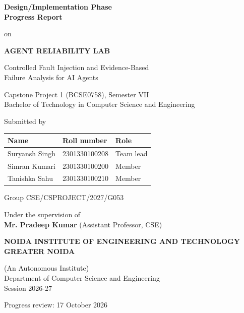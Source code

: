 \documentclass[12pt,a4paper,oneside]{report}
\begin{document}
\begin{titlepage}
\centering
\onehalfspacing
{\fontsize{20}{26}\selectfont\bfseries Design/Implementation Phase\\ Progress Report\par}
\vspace{0.8cm}
{\fontsize{14}{18}\selectfont on\par}
\vspace{0.4cm}
{\fontsize{20}{26}\selectfont\bfseries AGENT RELIABILITY LAB\par}
\vspace{0.2cm}
{\fontsize{14}{18}\selectfont Controlled Fault Injection and Evidence-Based\\ Failure Analysis for AI Agents\par}
\vspace{0.8cm}
{\fontsize{14}{18}\selectfont Capstone Project 1 (BCSE0758), Semester VII\\ Bachelor of Technology in Computer Science and Engineering\par}
\vspace{0.8cm}
{\fontsize{14}{18}\selectfont Submitted by\par}
\vspace{0.3cm}
\begin{tabular}{lll}
\toprule
\textbf{Name} & \textbf{Roll number} & \textbf{Role} \\
\midrule
Suryansh Singh & 2301330100208 & Team lead \\
Simran Kumari & 2301330100200 & Member \\
Tanishka Sahu & 2301330100210 & Member \\
\bottomrule
\end{tabular}\par
\vspace{0.6cm}
{\fontsize{14}{18}\selectfont Group CSE/CSPROJECT/2027/G053\par}
\vspace{0.6cm}
{\fontsize{14}{18}\selectfont Under the supervision of\\ \textbf{Mr. Pradeep Kumar} (Assistant Professor, CSE)\par}
\vfill
{\fontsize{14}{18}\selectfont\bfseries NOIDA INSTITUTE OF ENGINEERING AND TECHNOLOGY\\ GREATER NOIDA\par}
{\fontsize{12}{15}\selectfont (An Autonomous Institute)\\ Department of Computer Science and Engineering\\ Session 2026-27\par}
\vspace{0.4cm}
{\fontsize{12}{15}\selectfont Progress review: 17 October 2026\par}
\end{titlepage}
\end{document}
